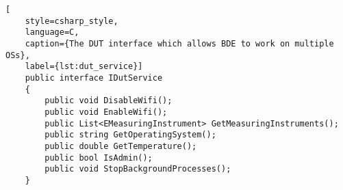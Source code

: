 \begin{lstlisting}[
    style=csharp_style,
    language=C, 
    caption={The DUT interface which allows BDE to work on multiple OSs},
    label={lst:dut_service}]
    public interface IDutService
    {
        public void DisableWifi();
        public void EnableWifi();
        public List<EMeasuringInstrument> GetMeasuringInstruments();
        public string GetOperatingSystem();
        public double GetTemperature();
        public bool IsAdmin();
        public void StopBackgroundProcesses();
    }
\end{lstlisting}